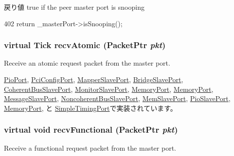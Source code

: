 \begin{DoxyReturn}{戻り値}
true if the peer master port is snooping 
\end{DoxyReturn}



\begin{DoxyCode}
402 { return _masterPort->isSnooping(); }
\end{DoxyCode}
\hypertarget{classSlavePort_a428ab07671bc9372dc44a2487b12a726}{
\subsubsection[{recvAtomic}]{\setlength{\rightskip}{0pt plus 5cm}virtual {\bf Tick} recvAtomic ({\bf PacketPtr} {\em pkt})}}
\label{classSlavePort_a428ab07671bc9372dc44a2487b12a726}
Receive an atomic request packet from the master port. 

\hyperlink{classPioPort_a5f0b4c4a94f6b0053f9d7a4eb9c2518a}{PioPort}, \hyperlink{classPciDevice_1_1PciConfigPort_a5f0b4c4a94f6b0053f9d7a4eb9c2518a}{PciConfigPort}, \hyperlink{classAddrMapper_1_1MapperSlavePort_a5f0b4c4a94f6b0053f9d7a4eb9c2518a}{MapperSlavePort}, \hyperlink{classBridge_1_1BridgeSlavePort_a5f0b4c4a94f6b0053f9d7a4eb9c2518a}{BridgeSlavePort}, \hyperlink{classCoherentBus_1_1CoherentBusSlavePort_a9b5348b3521da3a6333e6b0eed3b98e6}{CoherentBusSlavePort}, \hyperlink{classCommMonitor_1_1MonitorSlavePort_a5f0b4c4a94f6b0053f9d7a4eb9c2518a}{MonitorSlavePort}, \hyperlink{classDRAMCtrl_1_1MemoryPort_a5f0b4c4a94f6b0053f9d7a4eb9c2518a}{MemoryPort}, \hyperlink{classDRAMSim2_1_1MemoryPort_a5f0b4c4a94f6b0053f9d7a4eb9c2518a}{MemoryPort}, \hyperlink{classMessageSlavePort_a5f0b4c4a94f6b0053f9d7a4eb9c2518a}{MessageSlavePort}, \hyperlink{classNoncoherentBus_1_1NoncoherentBusSlavePort_a9b5348b3521da3a6333e6b0eed3b98e6}{NoncoherentBusSlavePort}, \hyperlink{classRubyPort_1_1MemSlavePort_a5f0b4c4a94f6b0053f9d7a4eb9c2518a}{MemSlavePort}, \hyperlink{classRubyPort_1_1PioSlavePort_a5f0b4c4a94f6b0053f9d7a4eb9c2518a}{PioSlavePort}, \hyperlink{classSimpleMemory_1_1MemoryPort_a5f0b4c4a94f6b0053f9d7a4eb9c2518a}{MemoryPort}, と \hyperlink{classSimpleTimingPort_a428ab07671bc9372dc44a2487b12a726}{SimpleTimingPort}で実装されています。\hypertarget{classSlavePort_a6a3d6f2e5dab6bed16d53d9e7c17378d}{
\subsubsection[{recvFunctional}]{\setlength{\rightskip}{0pt plus 5cm}virtual void recvFunctional ({\bf PacketPtr} {\em pkt})}}
\label{classSlavePort_a6a3d6f2e5dab6bed16d53d9e7c17378d}
Receive a functional request packet from the master port. 

